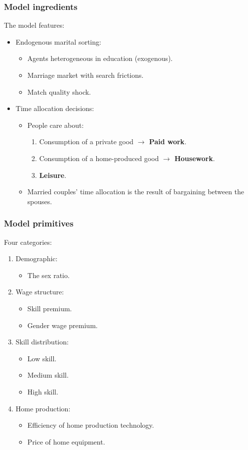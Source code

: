 \documentclass{beamer}
\begin{document}
\begin{frame}
	\frametitle{Model ingredients}\label{frame:model_ingredients}
	The model features:
	\begin{itemize}
		\item Endogenous marital sorting:
		\begin{itemize}
			\item Agents heterogeneous in education (exogenous).
			\item Marriage market with search frictions.
			\item Match quality shock.
		\end{itemize}
		\item Time allocation decisions:
		\begin{itemize}
			\item People care about:
			\begin{enumerate}
				\item Consumption of a private good \textbf{$\rightarrow$ Paid work}.
				\item Consumption of a home-produced good \textbf{$\rightarrow$ Housework}.
				\item \textbf{Leisure}.
			\end{enumerate}
			\item Married couples' time allocation is the result of bargaining between the spouses.
		\end{itemize}
	\end{itemize}
\end{frame}

\begin{frame}
	\frametitle{Model primitives}
	Four categories:
	\begin{enumerate}
		\item Demographic:
		\begin{itemize}
			\item The sex ratio.
		\end{itemize}
		\item Wage structure:
		\begin{itemize}
			\item Skill premium.
			\item Gender wage premium.
		\end{itemize}
		\item Skill distribution:
		\begin{itemize}
			\item Low skill.
			\item Medium skill.
			\item High skill.
		\end{itemize}
		\item Home production:
		\begin{itemize}
			\item Efficiency of home production technology.
			\item Price of home equipment.
		\end{itemize}
	\end{enumerate}
\end{frame}
\end{document}
